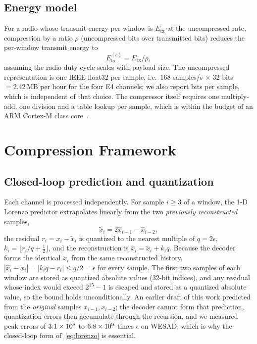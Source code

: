 \documentclass[conference]{IEEEtran}
\begin{document}
\subsection{Energy model}
For a radio whose transmit energy per window is $E_{\mathrm{tx}}$ at the uncompressed rate, compression by a ratio $\rho$ (uncompressed bits over transmitted bits) reduces the per-window transmit energy to
\begin{equation}
E^{(c)}_{\mathrm{tx}} = E_{\mathrm{tx}}/\rho ,
\label{eq:energy}
\end{equation}
assuming the radio duty cycle scales with payload size. The uncompressed representation is one IEEE float32 per sample, i.e.\ $168$ samples/s $\times$ 32 bits $= 2.42$\,MB per hour for the four E4 channels; we also report bits per sample, which is independent of that choice. The compressor itself requires one multiply-add, one division and a table lookup per sample, which is within the budget of an ARM Cortex-M class core~\cite{azar2022}.

\section{Compression Framework}
\subsection{Closed-loop prediction and quantization}
Each channel is processed independently. For sample $i\ge 3$ of a window, the 1-D Lorenzo predictor extrapolates linearly from the two \emph{previously reconstructed} samples,
\begin{equation}
\tilde{x}_i = 2\hat{x}_{i-1} - \hat{x}_{i-2},
\label{eq:lorenzo}
\end{equation}
the residual $r_i = x_i - \tilde{x}_i$ is quantized to the nearest multiple of $q=2\epsilon$, $k_i=\lfloor r_i/q + \tfrac12\rfloor$, and the reconstruction is $\hat{x}_i = \tilde{x}_i + k_i q$. Because the decoder forms the identical $\tilde{x}_i$ from the same reconstructed history, $|\hat{x}_i-x_i| = |k_i q - r_i| \le q/2 = \epsilon$ for every sample. The first two samples of each window are stored as quantized absolute values (32-bit indices), and any residual whose index would exceed $2^{15}-1$ is escaped and stored as a quantized absolute value, so the bound holds unconditionally. An earlier draft of this work predicted from the \emph{original} samples $x_{i-1},x_{i-2}$; the decoder cannot form that prediction, quantization errors then accumulate through the recursion, and we measured peak errors of $3.1\times10^{8}$ to $6.8\times10^{9}$ times $\epsilon$ on WESAD, which is why the closed-loop form of~\eqref{eq:lorenzo} is essential.
\end{document}
